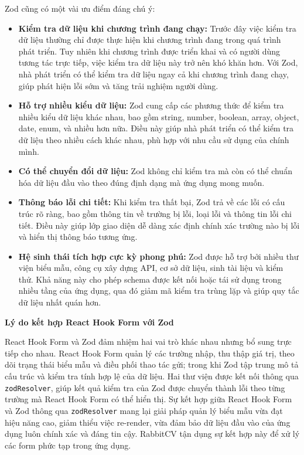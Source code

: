 \medskip
Zod cũng có một vài ưu điểm đáng chú ý:
\medskip

\begin{itemize}
    \item \textbf{Kiểm tra dữ liệu khi chương trình đang chạy:} Trước đây việc kiểm tra dữ liệu thường chỉ được thực hiện khi chương trình đang trong quá trình phát triển. Tuy nhiên khi chương trình được triển khai và có người dùng tương tác trực tiếp, việc kiểm tra dữ liệu này trở nên khó khăn hơn. Với Zod, nhà phát triển có thể kiểm tra dữ liệu ngay cả khi chương trình đang chạy, giúp phát hiện lỗi sớm và tăng trải nghiệm người dùng.

    \item \textbf{Hỗ trợ nhiều kiểu dữ liệu:} Zod cung cấp các phương thức để kiểm tra nhiều kiểu dữ liệu khác nhau, bao gồm string, number, boolean, array, object, date, enum, và nhiều hơn nữa. Điều này giúp nhà phát triển có thể kiểm tra dữ liệu theo nhiều cách khác nhau, phù hợp với nhu cầu sử dụng của chính mình.

    \item \textbf{Có thể chuyển đổi dữ liệu:} Zod không chỉ kiểm tra mà còn có thể chuẩn hóa dữ liệu đầu vào theo đúng định dạng mà ứng dụng mong muốn.

    \item \textbf{Thông báo lỗi chi tiết:} Khi kiểm tra thất bại, Zod trả về các lỗi có cấu trúc rõ ràng, bao gồm thông tin về trường bị lỗi, loại lỗi và thông tin lỗi chi tiết. Điều này giúp lớp giao diện dễ dàng xác định chính xác trường nào bị lỗi và hiển thị thông báo tương ứng.
    
    \item \textbf{Hệ sinh thái tích hợp cực kỳ phong phú:} Zod được hỗ trợ bởi nhiều thư viện biểu mẫu, công cụ xây dựng API, cơ sở dữ liệu, sinh tài liệu và kiểm thử. Khả năng này cho phép schema được kết nối hoặc tái sử dụng trong nhiều tầng của ứng dụng, qua đó giảm mã kiểm tra trùng lặp và giúp quy tắc dữ liệu nhất quán hơn.
\end{itemize}


\medskip
\noindent\textbf{Lý do kết hợp React Hook Form với Zod}
\medskip

React Hook Form và Zod đảm nhiệm hai vai trò khác nhau nhưng bổ sung trực tiếp cho nhau. React Hook Form quản lý các trường nhập, thu thập giá trị, theo dõi trạng thái biểu mẫu và điều phối thao tác gửi; trong khi Zod tập trung mô tả cấu trúc và kiểm tra tính hợp lệ của dữ liệu. Hai thư viện được kết nối thông qua \texttt{zodResolver}, giúp kết quả kiểm tra của Zod được chuyển thành lỗi theo từng trường mà React Hook Form có thể hiển thị. Sự kết hợp giữa React Hook Form và Zod thông qua \texttt{zodResolver} mang lại giải pháp quản lý biểu mẫu vừa đạt hiệu năng cao, giảm thiểu việc re-render, vừa đảm bảo dữ liệu đầu vào của ứng dụng luôn chính xác và đáng tin cậy. RabbitCV tận dụng sự kết hợp này để xử lý các form phức tạp trong ứng dụng.

